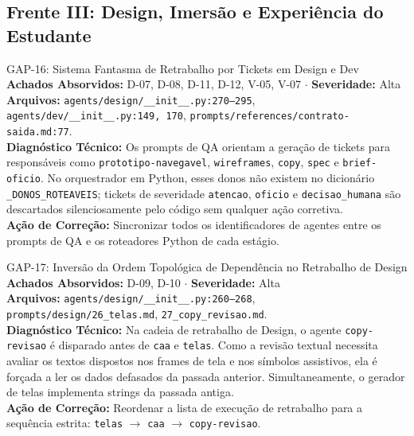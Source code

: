 \documentclass[11pt,a4paper]{article}
\begin{document}
\newpage
\subsection{Frente III: Design, Imersão e Experiência do Estudante}

\begin{gapbox}{GAP-16: Sistema Fantasma de Retrabalho por Tickets em Design e Dev}
\textbf{Achados Absorvidos:} D-07, D-08, D-11, D-12, V-05, V-07 $\cdot$ \textbf{Severidade:} Alta\\
\textbf{Arquivos:} \texttt{agents/design/\_\_init\_\_.py:270--295}, \texttt{agents/dev/\_\_init\_\_.py:149, 170}, \texttt{prompts/references/contrato-saida.md:77}.\\
\textbf{Diagnóstico Técnico:} Os prompts de QA orientam a geração de tickets para responsáveis como \texttt{prototipo-navegavel}, \texttt{wireframes}, \texttt{copy}, \texttt{spec} e \texttt{brief-oficio}. No orquestrador em Python, esses donos não existem no dicionário \texttt{\_DONOS\_ROTEAVEIS}; tickets de severidade \texttt{atencao}, \texttt{oficio} e \texttt{decisao\_humana} são descartados silenciosamente pelo código sem qualquer ação corretiva.\\
\textbf{Ação de Correção:} Sincronizar todos os identificadores de agentes entre os prompts de QA e os roteadores Python de cada estágio.
\end{gapbox}

\begin{gapbox}{GAP-17: Inversão da Ordem Topológica de Dependência no Retrabalho de Design}
\textbf{Achados Absorvidos:} D-09, D-10 $\cdot$ \textbf{Severidade:} Alta\\
\textbf{Arquivos:} \texttt{agents/design/\_\_init\_\_.py:260--268}, \texttt{prompts/design/26\_telas.md}, \texttt{27\_copy\_revisao.md}.\\
\textbf{Diagnóstico Técnico:} Na cadeia de retrabalho de Design, o agente \texttt{copy-revisao} é disparado antes de \texttt{caa} e \texttt{telas}. Como a revisão textual necessita avaliar os textos dispostos nos frames de tela e nos símbolos assistivos, ela é forçada a ler os dados defasados da passada anterior. Simultaneamente, o gerador de telas implementa strings da passada antiga.\\
\textbf{Ação de Correção:} Reordenar a lista de execução de retrabalho para a sequência estrita: \texttt{telas} $\to$ \texttt{caa} $\to$ \texttt{copy-revisao}.
\end{gapbox}
\end{document}
